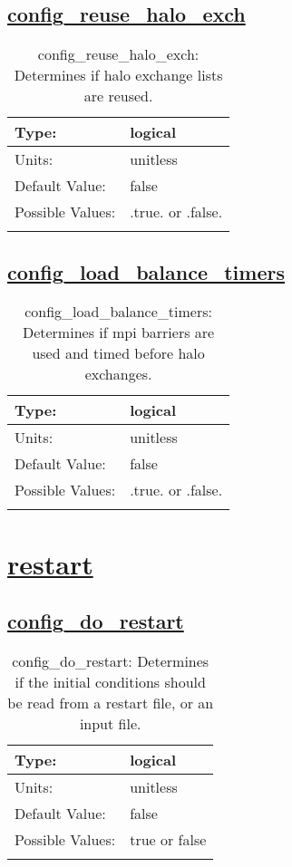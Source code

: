 \subsection[config\_reuse\_halo\_exch]{\hyperref[sec:nm_tab_decomposition]{config\_reuse\_halo\_exch}}
\label{subsec:nm_sec_config_reuse_halo_exch}
\begin{center}
\begin{longtable}{| p{2.0in} || p{4.0in} |}
    \hline
    Type: & logical \\
    \hline
    Units: & \si{unitless} \\
    \hline
    Default Value: & false \\
    \hline
    Possible Values: & .true. or .false. \\
    \hline
    \caption{config\_reuse\_halo\_exch: Determines if halo exchange lists are reused.}
\end{longtable}
\end{center}
\subsection[config\_load\_balance\_timers]{\hyperref[sec:nm_tab_decomposition]{config\_load\_balance\_timers}}
\label{subsec:nm_sec_config_load_balance_timers}
\begin{center}
\begin{longtable}{| p{2.0in} || p{4.0in} |}
    \hline
    Type: & logical \\
    \hline
    Units: & \si{unitless} \\
    \hline
    Default Value: & false \\
    \hline
    Possible Values: & .true. or .false. \\
    \hline
    \caption{config\_load\_balance\_timers: Determines if mpi barriers are used and timed before halo exchanges.}
\end{longtable}
\end{center}
\section[restart]{\hyperref[sec:nm_tab_restart]{restart}}
\label{sec:nm_sec_restart}
\subsection[config\_do\_restart]{\hyperref[sec:nm_tab_restart]{config\_do\_restart}}
\label{subsec:nm_sec_config_do_restart}
\begin{center}
\begin{longtable}{| p{2.0in} || p{4.0in} |}
    \hline
    Type: & logical \\
    \hline
    Units: & \si{unitless} \\
    \hline
    Default Value: & false \\
    \hline
    Possible Values: & true or false \\
    \hline
    \caption{config\_do\_restart: Determines if the initial conditions should be read from a restart file, or an input file.}
\end{longtable}
\end{center}
